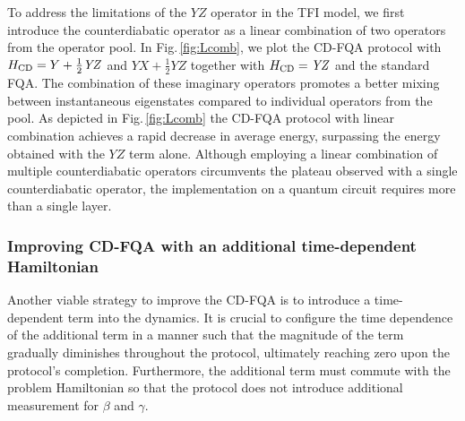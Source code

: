 \documentclass[twocolumn,aps,superscriptaddress,floatfix,longbibliography]{revtex4-2}
\newcommand{\Fig}[1]{Fig.\,\ref{fig:#1}}
\def\YX{\ensuremath{\mathit{YX}}\xspace} %
\def\YZ{\ensuremath{\mathit{YZ}}\xspace}
\begin{document}
To address the limitations of the \YZ operator in the TFI model,
we first introduce the counterdiabatic operator as a linear
combination of two operators from the operator pool. In
\Fig{Lcomb}, we plot the CD-FQA protocol with $H_{\rm CD}=Y+
\frac{1}{2} %
\YZ$ and $\YX + \frac{1}{2} %
\YZ$ together with $H_{\rm CD}=\YZ$ and
the standard FQA.  The combination of these imaginary operators
promotes a better mixing between instantaneous eigenstates
compared to individual operators from the pool. As depicted in
\Fig{Lcomb} the CD-FQA protocol with linear combination achieves
a rapid decrease in average energy, surpassing the energy
obtained with the \YZ term alone. Although employing a linear
combination of multiple counterdiabatic operators circumvents
the plateau observed with a single counterdiabatic operator, the
implementation on a quantum circuit requires more than a single
layer. 


\subsubsection{Improving CD-FQA with an additional time-dependent Hamiltonian}

Another viable strategy to improve the CD-FQA is to introduce a time-dependent term
into the dynamics. It is crucial to configure the time
dependence of the additional term in a manner such that the magnitude 
of the term gradually diminishes throughout the protocol,
ultimately reaching zero upon the protocol's completion.
Furthermore, the additional term must commute
with the problem Hamiltonian so that the protocol does not
introduce additional measurement for $\beta$ and $\gamma$.
\end{document}
